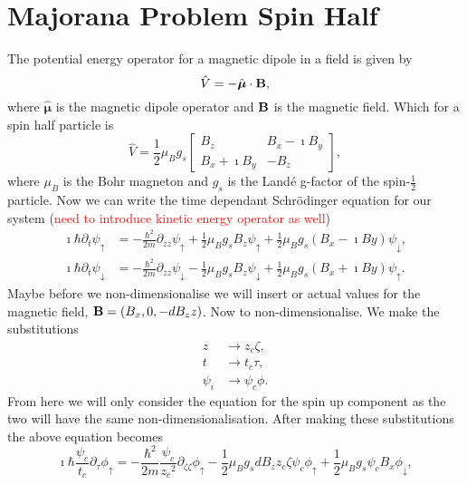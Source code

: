 \section{Majorana Problem Spin Half}
The potential energy operator \cite{foot:2005} for a magnetic dipole in a field is given by
\begin{equation}
    \hat{V} = -\hat{\boldsymbol\mu}\cdot\bf{B},
\end{equation}
where $\hat{\boldsymbol\mu}$ is the magnetic dipole operator and $\bf{B}$ is the magnetic field. Which for a spin half particle is 
\begin{equation*}
    \hat{V} = \frac{1}{2}\mu_{B}g_{s} \begin{bmatrix} B_{z}                & B_{x} - \imath B_{y} \\
                                                      B_{x} + \imath B_{y} & -B_{z} \end{bmatrix},
\end{equation*}
where $\mu_{B}$ is the Bohr magneton \cite{??} and $g_s$ is the Land\'e g-factor of the spin-$\frac{1}{2}$ particle. Now we can write the time dependant Schr\"odinger equation for our system (\textcolor{red}{need to introduce kinetic energy operator as well})
\begin{align}
    \imath \hbar \partial_t \psi_\uparrow &= -\frac{\hbar^{2}}{2m}\partial_{zz} \psi_\uparrow  + \frac{1}{2}\mu_{B}g_{s}B_{z} \psi_\uparrow + \frac{1}{2}\mu_{B}g_{s} \left(B_{x} - \imath B{y}\right) \psi_\downarrow,\\
    \imath \hbar \partial_t \psi_\downarrow  &= -\frac{\hbar^{2}}{2m}\partial_{zz} \psi_\downarrow - \frac{1}{2}\mu_{B}g_{s}B_{z} \psi_\downarrow + \frac{1}{2}\mu_{B}g_{s} \left(B_{x} + \imath B{y}\right) \psi_\uparrow.
\end{align}
Maybe before we non-dimensionalise we will insert or actual values for the magnetic field, ${\bf B} = \left(B_x, 0, -dB_{z} z\right)$. Now to non-dimensionalise. We make the substitutions
\begin{align*}
    z &\to z_{c}\zeta,\\
    t &\to t_{c}\tau,\\
    \psi_{i} &\to \psi_{c}\phi.
\end{align*}
From here we will only consider the equation for the spin up component as the two will have the same non-dimensionalisation. After making these substitutions the above equation becomes
\begin{equation*}
    \imath \hbar \frac{\psi_{c}}{t_{c}}\partial_{\tau} \phi_\uparrow = -\frac{\hbar^{2}}{2m}\frac{\psi_c}{{z_{c}}^2}\partial_{\zeta\zeta} \phi_\uparrow - \frac{1}{2}\mu_{B}g_{s}dB_{z} z_{c} \zeta \psi_{c}\phi_\uparrow + \frac{1}{2}\mu_{B}g_{s}\psi_{c} B_{x} \phi_\downarrow,
\end{equation*}
